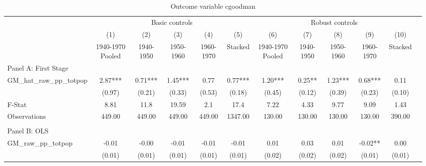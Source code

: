  \begin{table}[htbp]\centering {} \begin{threeparttable} \caption{Outcome variable cgoodman } \begin{tabular}{l*{11}{c}} \toprule
          &\multicolumn{5}{c}{Basic controls}                                   &\multicolumn{5}{c}{Robust controls}                                  \\\cmidrule(lr){2-6}\cmidrule(lr){7-11}
          &\multicolumn{1}{c}{(1)}&\multicolumn{1}{c}{(2)}&\multicolumn{1}{c}{(3)}&\multicolumn{1}{c}{(4)}&\multicolumn{1}{c}{(5)}&\multicolumn{1}{c}{(6)}&\multicolumn{1}{c}{(7)}&\multicolumn{1}{c}{(8)}&\multicolumn{1}{c}{(9)}&\multicolumn{1}{c}{(10)}\\
          &\multicolumn{1}{c}{1940-1970 Pooled}&\multicolumn{1}{c}{1940-1950}&\multicolumn{1}{c}{1950-1960}&\multicolumn{1}{c}{1960-1970}&\multicolumn{1}{c}{Stacked}&\multicolumn{1}{c}{1940-1970 Pooled}&\multicolumn{1}{c}{1940-1950}&\multicolumn{1}{c}{1950-1960}&\multicolumn{1}{c}{1960-1970}&\multicolumn{1}{c}{Stacked}\\
\cmidrule(lr){1-11}
\multicolumn{10}{l}{Panel A: First Stage}\\
\cmidrule(lr){1-11}
GM\_hat\_raw\_pp\_totpop&      2.87***&      0.71***&      1.45***&      0.77   &      0.77***&      1.20***&      0.25** &      1.23***&      0.68***&      0.11   \\
          &    (0.97)   &    (0.21)   &    (0.33)   &    (0.53)   &    (0.18)   &    (0.45)   &    (0.12)   &    (0.39)   &    (0.23)   &    (0.10)   \\
\midrule
F-Stat    &      8.81   &      11.8   &     19.59   &       2.1   &      17.4   &      7.22   &      4.33   &      9.77   &      9.09   &      1.43   \\
Observations&    449.00   &    449.00   &    449.00   &    449.00   &   1347.00   &    130.00   &    130.00   &    130.00   &    130.00   &    390.00   \\
\cmidrule[\heavyrulewidth](lr){1-11} \\ \cmidrule[\heavyrulewidth](lr){1-11}
\multicolumn{10}{l}{Panel B: OLS}\\
\cmidrule(lr){1-11}
GM\_raw\_pp\_totpop&     -0.01   &     -0.00   &     -0.01   &     -0.01   &     -0.01   &      0.01   &      0.03   &      0.01   &     -0.02** &      0.00   \\
          &    (0.01)   &    (0.01)   &    (0.01)   &    (0.01)   &    (0.01)   &    (0.02)   &    (0.02)   &    (0.02)   &    (0.01)   &    (0.01)   \\

\end{tabular}
\end{threeparttable}
\end{table}
